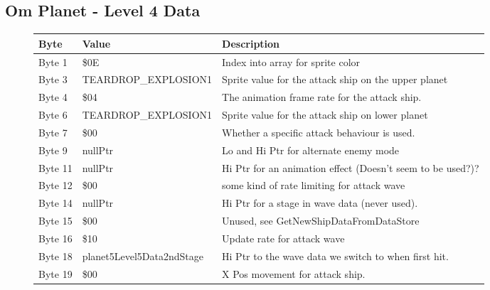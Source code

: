 \clearpage
\subsection{Om Planet - Level 4 Data}

\begin{figure}[H]
  {
  \setlength{\tabcolsep}{3.0pt}
  \setlength\cmidrulewidth{\heavyrulewidth} %
  \begin{adjustbox}{width=12cm}

\begin{tabular}{lll}
\toprule
 Byte    & Value                     & Description                                                        \\
\midrule
 Byte 1  & \$0E                       & Index into array for sprite color                                  \\
 Byte 3  & TEARDROP\_EXPLOSION1       & Sprite value for the attack ship on the upper planet               \\
 Byte 4  & \$04                       & The animation frame rate for the attack ship.                      \\
 Byte 6  & TEARDROP\_EXPLOSION1       & Sprite value for the attack ship on lower planet                   \\
 Byte 7  & \$00                       & Whether a specific attack behaviour is used.                       \\
 Byte 9  & nullPtr                   & Lo and Hi Ptr for alternate enemy mode                             \\
 Byte 11 & nullPtr                   & Hi Ptr for an animation effect (Doesn't seem to be used?)?         \\
 Byte 12 & \$00                       & some kind of rate limiting for attack wave                         \\
 Byte 14 & nullPtr                   & Hi Ptr for a stage in wave data (never used).                      \\
 Byte 15 & \$00                       & Unused, see GetNewShipDataFromDataStore                            \\
 Byte 16 & \$10                       & Update rate for attack wave                                        \\
 Byte 18 & planet5Level5Data2ndStage & Hi Ptr to the wave data we switch to when first hit.               \\
 Byte 19 & \$00                       & X Pos movement for attack ship.                                    \\

\end{tabular}
\end{adjustbox}}
\end{figure}
